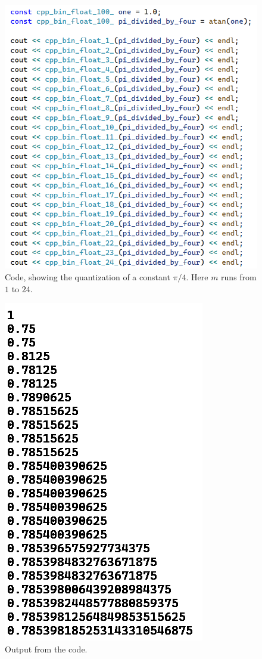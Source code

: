 \documentclass[12pt]{article}
\begin{document}
\pagebreak



\begin{figure} 
\centering
\label{fig7}
  \includegraphics[width = 4 in]{code.png}
  \caption{
Code, showing the quantization of a constant $\pi/4$.
Here $m$ runs from $1$ to $24$.
}
\end{figure}

\begin{figure} 
\centering
\label{fig7}
  \includegraphics[width = 3 in]{code_output.png}
  \caption{
Output from the code.
}
\end{figure}
\end{document}
